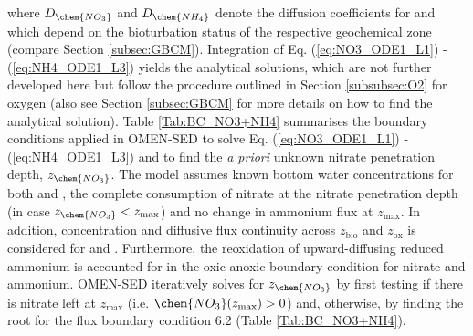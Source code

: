 \documentclass[gmd, manuscript]{copernicus}
\begin{document}
where $D_\chem{NO_3}$ and $D_{\chem{NH_4}}$ denote the diffusion coefficients for  and  which depend on the bioturbation status of the respective geochemical zone (compare Section \ref{subsec:GBCM}). 
Integration of Eq. (\ref{eq:NO3_ODE1_L1}) - (\ref{eq:NH4_ODE1_L3}) yields the analytical solutions, which are not further developed here but follow the procedure outlined in Section \ref{subsubsec:O2} for oxygen 
(also see Section \ref{subsec:GBCM} for more details on how to find the analytical solution). Table \ref{Tab:BC_NO3+NH4} summarises the boundary conditions applied in OMEN-SED to solve Eq. (\ref{eq:NO3_ODE1_L1}) - (\ref{eq:NH4_ODE1_L3}) 
and to find the \textit{a priori} unknown nitrate penetration depth, $z_\chem{NO_3}$. 
The model assumes known bottom water concentrations for both  and , the complete consumption of nitrate at the nitrate penetration depth (in case  $z_{\chem{NO_3}} < z_\mathrm{max}$) and no change in %
ammonium flux at $z_\mathrm{max}$. In addition, concentration and diffusive flux continuity across $z_{\mathrm{bio}}$ and $z_{\mathrm{ox}}$ is considered for  and . 
Furthermore, the reoxidation of upward-diffusing reduced ammonium is accounted for in the oxic-anoxic boundary condition for nitrate and ammonium. 
OMEN-SED iteratively solves for $z_{\chem{NO_3}}$ by first testing if there is nitrate left at $z_\mathrm{max}$ (i.e. $\chem{NO_3}(z_\mathrm{max}) > 0$) and, otherwise, by finding the root for the flux 
boundary condition 6.2 (Table \ref{Tab:BC_NO3+NH4}).
\end{document}
